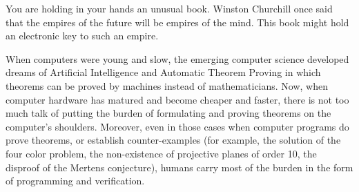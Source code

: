 
%
%
%
%
%



You are holding in your hands an unusual book.
Winston Churchill once said that the empires of the future will be
empires of the mind.
This book might hold an electronic key to such an empire.

When computers were young and slow, the emerging computer science
developed dreams of Artificial Intelligence and Automatic Theorem
Proving in which theorems can be proved by machines instead of
mathematicians.
Now, when computer hardware has matured and become cheaper and
faster, there is not too much talk of putting the burden of
formulating and proving theorems on the computer's shoulders.
Moreover, even in those cases when computer programs do prove
theorems, or establish counter-examples (for example, the solution
of the four color problem, the non-existence of projective planes
of order 10, the disproof of the Mertens conjecture), humans carry
most of the burden in the form of programming and verification.

